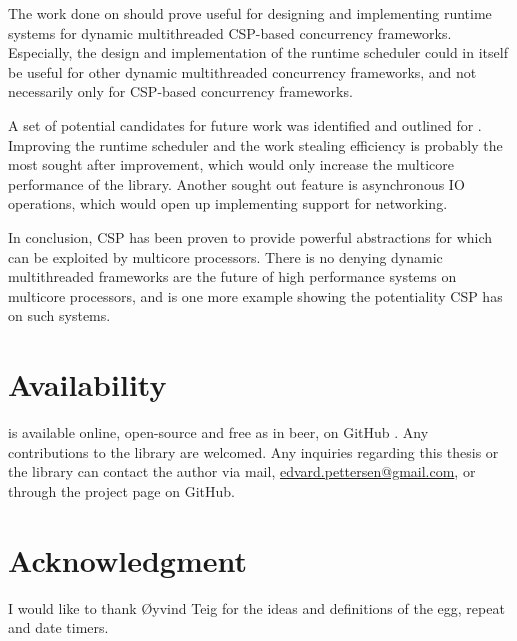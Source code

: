 The work done on \Proxc{} should prove useful for designing and implementing runtime systems for dynamic multithreaded CSP\hyp{}based concurrency frameworks. Especially, the design and implementation of the runtime scheduler could in itself be useful for other dynamic multithreaded concurrency frameworks, and not necessarily only for CSP\hyp{}based concurrency frameworks.

A set of potential candidates for future work was identified and outlined for \Proxc{}. Improving the runtime scheduler and the work stealing efficiency is probably the most sought after improvement, which would only increase the multicore performance of the library. Another sought out feature is asynchronous IO operations, which would open up implementing support for networking.

In conclusion, CSP has been proven to provide powerful abstractions for which can be exploited by multicore processors. There is no denying dynamic multithreaded frameworks are the future of high performance systems on multicore processors, and \Proxc{} is one more example showing the potentiality CSP has on such systems.


\section{Availability}


\Proxc{} is available online, open\hyp{}source and free as in beer, on GitHub \citep{pettersen2017proxcgithub}. Any contributions to the library are welcomed. Any inquiries regarding this thesis or the library can contact the author via mail, \href{mailto:edvard.pettersen@gmail.com}{edvard.pettersen@gmail.com}, or through the project page on GitHub.


\section{Acknowledgment}


I would like to thank Øyvind Teig for the ideas and definitions of the egg, repeat and date timers.

